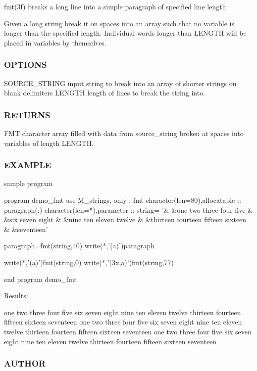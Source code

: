 fmt(3f) breaks a long line into a simple paragraph of specified line length.

Given a long string break it on spaces into an array such that no variable is longer than the specified length. Individual words longer than L\+E\+N\+G\+TH will be placed in variables by themselves. \subsubsection*{O\+P\+T\+I\+O\+NS}

S\+O\+U\+R\+C\+E\+\_\+\+S\+T\+R\+I\+NG input string to break into an array of shorter strings on blank delimiters L\+E\+N\+G\+TH length of lines to break the string into. \subsubsection*{R\+E\+T\+U\+R\+NS}

F\+MT character array filled with data from source\+\_\+string broken at spaces into variables of length L\+E\+N\+G\+TH. \subsubsection*{E\+X\+A\+M\+P\+LE}

sample program \begin{DoxyVerb}program demo_fmt
use M_strings, only : fmt
character(len=80),allocatable :: paragraph(:)
character(len=*),parameter    :: string= '&
 &one two three four five &
 &six seven eight &
 &nine ten eleven twelve &
 &thirteen fourteen fifteen sixteen &
 &seventeen'

paragraph=fmt(string,40)
write(*,'(a)')paragraph

write(*,'(a)')fmt(string,0)
write(*,'(3x,a)')fmt(string,77)

end program demo_fmt
\end{DoxyVerb}


Results\+: \begin{DoxyVerb}one two three four five six seven eight
nine ten eleven twelve thirteen fourteen
fifteen sixteen seventeen
one
two
three
four
five
six
seven
eight
nine
ten
eleven
twelve
thirteen
fourteen
fifteen
sixteen
seventeen
   one two three four five six seven eight nine ten eleven twelve thirteen
   fourteen fifteen sixteen seventeen
\end{DoxyVerb}


\subsubsection*{A\+U\+T\+H\+OR}

